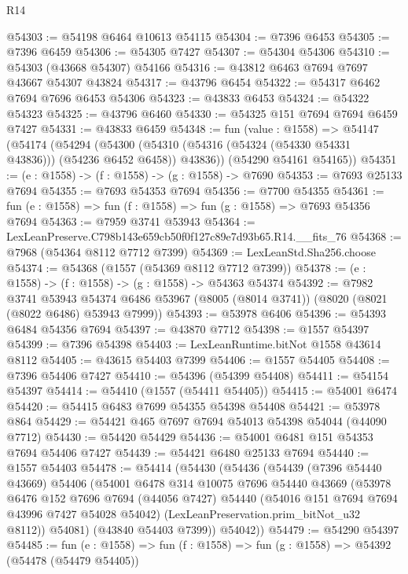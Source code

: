 \begin{lexlean}{R14}
\begin{coremodule}
@54303 := @54198 @6464 @10613 @54115
@54304 := @7396 @6453
@54305 := @7396 @6459
@54306 := @54305 @7427
@54307 := @54304 @54306
@54310 := @54303 (@43668 @54307) @54166
@54316 := @43812 @6463 @7694 @7697 @43667 @54307 @43824
@54317 := @43796 @6454
@54322 := @54317 @6462 @7694 @7696 @6453 @54306
@54323 := @43833 @6453
@54324 := @54322 @54323
@54325 := @43796 @6460
@54330 := @54325 @151 @7694 @7694 @6459 @7427
@54331 := @43833 @6459
@54348 := fun (value : @1558) =>
  @54147
    (@54174
      (@54294
        (@54300 (@54310 (@54316 (@54324 (@54330 @54331 @43836))) (@54236 @6452 @6458)) @43836))
      (@54290 @54161 @54165))
@54351 := (e : @1558) -> (f : @1558) -> (g : @1558) -> @7690
@54353 := @7693 @25133 @7694
@54355 := @7693 @54353 @7694
@54356 := @7700 @54355
@54361 := fun (e : @1558) => fun (f : @1558) => fun (g : @1558) => @7693 @54356 @7694
@54363 := @7959 @3741 @53943
@54364 := LexLeanPreserve.C798b143e659cb50f0f127c89e7d93b65.R14.__fits_76
@54368 := @7968 (@54364 @8112 @7712 @7399)
@54369 := LexLeanStd.Sha256.choose
@54374 := @54368 (@1557 (@54369 @8112 @7712 @7399))
@54378 := (e : @1558) -> (f : @1558) -> (g : @1558) -> @54363 @54374
@54392 := @7982
    @3741
    @53943
    @54374
    @6486
    @53967
    (@8005 (@8014 @3741))
    (@8020 (@8021 (@8022 @6486) @53943 @7999))
@54393 := @53978 @6406
@54396 := @54393 @6484 @54356 @7694
@54397 := @43870 @7712
@54398 := @1557 @54397
@54399 := @7396 @54398
@54403 := LexLeanRuntime.bitNot @1558 @43614 @8112
@54405 := @43615 @54403 @7399
@54406 := @1557 @54405
@54408 := @7396 @54406 @7427
@54410 := @54396 (@54399 @54408)
@54411 := @54154 @54397
@54414 := @54410 (@1557 (@54411 @54405))
@54415 := @54001 @6474
@54420 := @54415 @6483 @7699 @54355 @54398 @54408
@54421 := @53978 @864
@54429 := @54421 @465 @7697 @7694 @54013 @54398 @54044 (@44090 @7712)
@54430 := @54420 @54429
@54436 := @54001 @6481 @151 @54353 @7694 @54406 @7427
@54439 := @54421 @6480 @25133 @7694
@54440 := @1557 @54403
@54478 := @54414
    (@54430
      (@54436
        (@54439
          (@7396 @54440 @43669)
          @54406
          (@54001
            @6478
            @314
            @10075
            @7696
            @54440
            @43669
            (@53978
              @6476
              @152
              @7696
              @7694
              (@44056 @7427)
              @54440
              (@54016 @151 @7694 @7694 @43996 @7427 @54028 @54042)
              (LexLeanPreservation.prim_bitNot_u32 @8112))
            @54081)
          (@43840 @54403 @7399))
        @54042))
@54479 := @54290 @54397
@54485 := fun (e : @1558) => fun (f : @1558) => fun (g : @1558) => @54392 (@54478 (@54479 @54405))

\end{coremodule}
\end{lexlean}

